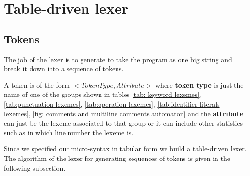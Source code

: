 \section{Table-driven lexer}
\subsection{Tokens}
The job of the lexer is to generate to take the program as one big string and break it down into a sequence of tokens.

A token is of the form $<TokenType,Attribute>$ where \textbf{token type} is just the name of one of the groups shown in tables \ref{tab: keyword lexemes}, \ref{tab:punctuation lexemes}, \ref{tab:operation lexemes}, \ref{tab:identifier literals lexemes}, \ref{fig: comments and multiline comments automaton} and the \textbf{attribute} can just be the lexeme associated to that group or it can include other statistics such as in which line number the lexeme  is.

\vskip 0.2in
Since we specified our micro-syntax in tabular form we  build a table-driven lexer. The algorithm of the lexer for generating sequences of tokens is given in the following subsection.
